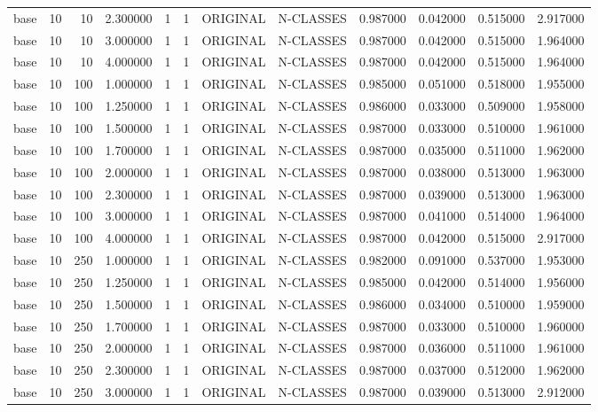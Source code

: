 \begin{tabular}{lrrrllllrrrr}
base & 10 & 10 & 2.300000 & 1 & 1 & ORIGINAL & N-CLASSES & 0.987000 & 0.042000 & 0.515000 & 2.917000 \\
base & 10 & 10 & 3.000000 & 1 & 1 & ORIGINAL & N-CLASSES & 0.987000 & 0.042000 & 0.515000 & 1.964000 \\
base & 10 & 10 & 4.000000 & 1 & 1 & ORIGINAL & N-CLASSES & 0.987000 & 0.042000 & 0.515000 & 1.964000 \\
base & 10 & 100 & 1.000000 & 1 & 1 & ORIGINAL & N-CLASSES & 0.985000 & 0.051000 & 0.518000 & 1.955000 \\
base & 10 & 100 & 1.250000 & 1 & 1 & ORIGINAL & N-CLASSES & 0.986000 & 0.033000 & 0.509000 & 1.958000 \\
base & 10 & 100 & 1.500000 & 1 & 1 & ORIGINAL & N-CLASSES & 0.987000 & 0.033000 & 0.510000 & 1.961000 \\
base & 10 & 100 & 1.700000 & 1 & 1 & ORIGINAL & N-CLASSES & 0.987000 & 0.035000 & 0.511000 & 1.962000 \\
base & 10 & 100 & 2.000000 & 1 & 1 & ORIGINAL & N-CLASSES & 0.987000 & 0.038000 & 0.513000 & 1.963000 \\
base & 10 & 100 & 2.300000 & 1 & 1 & ORIGINAL & N-CLASSES & 0.987000 & 0.039000 & 0.513000 & 1.963000 \\
base & 10 & 100 & 3.000000 & 1 & 1 & ORIGINAL & N-CLASSES & 0.987000 & 0.041000 & 0.514000 & 1.964000 \\
base & 10 & 100 & 4.000000 & 1 & 1 & ORIGINAL & N-CLASSES & 0.987000 & 0.042000 & 0.515000 & 2.917000 \\
base & 10 & 250 & 1.000000 & 1 & 1 & ORIGINAL & N-CLASSES & 0.982000 & 0.091000 & 0.537000 & 1.953000 \\
base & 10 & 250 & 1.250000 & 1 & 1 & ORIGINAL & N-CLASSES & 0.985000 & 0.042000 & 0.514000 & 1.956000 \\
base & 10 & 250 & 1.500000 & 1 & 1 & ORIGINAL & N-CLASSES & 0.986000 & 0.034000 & 0.510000 & 1.959000 \\
base & 10 & 250 & 1.700000 & 1 & 1 & ORIGINAL & N-CLASSES & 0.987000 & 0.033000 & 0.510000 & 1.960000 \\
base & 10 & 250 & 2.000000 & 1 & 1 & ORIGINAL & N-CLASSES & 0.987000 & 0.036000 & 0.511000 & 1.961000 \\
base & 10 & 250 & 2.300000 & 1 & 1 & ORIGINAL & N-CLASSES & 0.987000 & 0.037000 & 0.512000 & 1.962000 \\
base & 10 & 250 & 3.000000 & 1 & 1 & ORIGINAL & N-CLASSES & 0.987000 & 0.039000 & 0.513000 & 2.912000 \\

\end{tabular}
